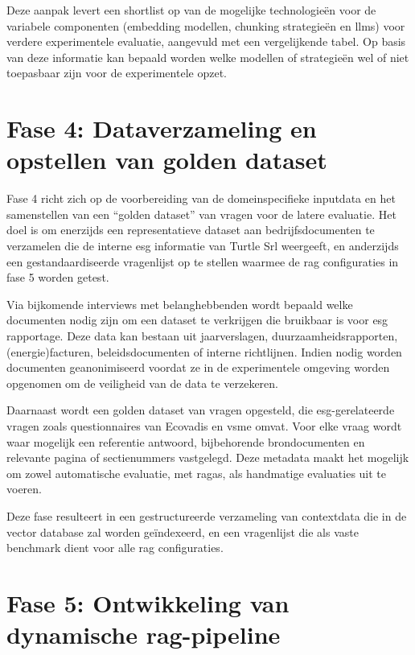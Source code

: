 Deze aanpak levert een shortlist op van de mogelijke technologieën voor de variabele componenten (embedding modellen, chunking strategieën en \glspl{llm}) voor verdere experimentele evaluatie, aangevuld met een vergelijkende tabel. Op basis van deze informatie kan bepaald worden welke modellen of strategieën wel of niet toepasbaar zijn voor de experimentele opzet.

\section{Fase 4: Dataverzameling en opstellen van golden dataset}

Fase 4 richt zich op de voorbereiding van de domeinspecifieke inputdata en het samenstellen van een ``golden dataset'' van vragen voor de latere evaluatie. Het doel is om enerzijds een representatieve dataset aan bedrijfsdocumenten te verzamelen die de interne \gls{esg} informatie van Turtle Srl weergeeft, en anderzijds een gestandaardiseerde vragenlijst op te stellen waarmee de \gls{rag} configuraties in fase 5 worden getest.

Via bijkomende interviews met belanghebbenden wordt bepaald welke documenten nodig zijn om een dataset te verkrijgen die bruikbaar is voor \gls{esg} rapportage. Deze data kan bestaan uit jaarverslagen, duurzaamheidsrapporten, (energie)facturen, beleidsdocumenten of interne richtlijnen. Indien nodig worden documenten geanonimiseerd voordat ze in de experimentele omgeving worden opgenomen om de veiligheid van de data te verzekeren.

Daarnaast wordt een golden dataset van vragen opgesteld, die \gls{esg}-gerelateerde vragen zoals questionnaires van Ecovadis en \gls{vsme} omvat. Voor elke vraag wordt waar mogelijk een referentie antwoord, bijbehorende brondocumenten en relevante pagina  of sectienummers vastgelegd. Deze metadata maakt het mogelijk om zowel automatische evaluatie, met \gls{ragas}, als handmatige evaluaties uit te voeren.

Deze fase resulteert in een gestructureerde verzameling van contextdata die in de vector database zal worden geïndexeerd, en een vragenlijst die als vaste benchmark dient voor alle \gls{rag} configuraties.

\section{Fase 5: Ontwikkeling van dynamische \gls{rag}-pipeline}

